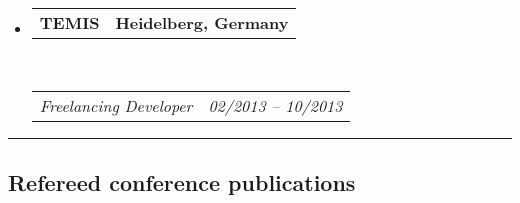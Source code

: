 \documentclass[10pt,letterpaper]{article}
\makeatletter
\newcommand{\headerrow}[2]
{\begin{tabular*}{\linewidth}{l@{\extracolsep{\fill}}r}
	#1 &
	#2 \\
\end{tabular*}}
\makeatother
\begin{document}
\begin{itemize}
	\item
	\headerrow
		{\textbf{TEMIS}}
		{\textbf{Heidelberg, Germany}}
	\\
	\headerrow
		{\emph{Freelancing Developer}}
		{\emph{02/2013 -- 10/2013}}

\end{itemize}

%
%

\hrule
\vspace{-0.4em}
\subsection*{Refereed conference publications}
\end{document}
